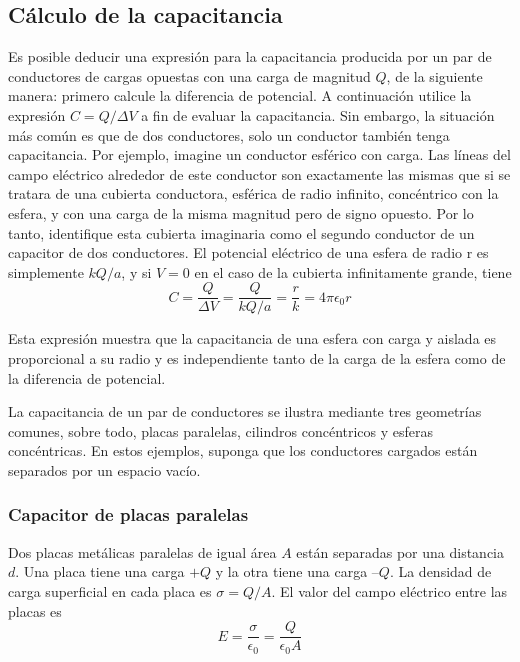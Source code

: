   \subsection{Cálculo de la capacitancia}
    \PN Es posible deducir una expresión para la capacitancia producida por un par de conductores de cargas opuestas con
    una carga de magnitud $Q$, de la siguiente manera: primero calcule la diferencia de potencial. A continuación
    utilice la expresión $C = Q / \Delta V$ a fin de evaluar la capacitancia.
    \PN Sin embargo, la situación más común es que de dos conductores, solo un conductor también tenga capacitancia. Por
    ejemplo, imagine un conductor esférico con carga. Las líneas del campo eléctrico alrededor de este conductor son
    exactamente las mismas que si se tratara de una cubierta conductora, esférica de radio infinito, concéntrico con la
    esfera, y con una carga de la misma magnitud pero de signo opuesto. Por lo tanto, identifique esta cubierta
    imaginaria como el segundo conductor de un capacitor de dos conductores. El potencial eléctrico de una esfera de
    radio r es simplemente $k Q/a$, y si $V = 0$ en el caso de la cubierta infinitamente grande, tiene
    \begin{equation*}
      C = \frac{Q}{\Delta V} = \frac{Q}{k Q/a} = \frac{r}{k} = 4 \pi \epsilon_{0} r
    \end{equation*}

    \PN Esta expresión muestra que la capacitancia de una esfera con carga y aislada es proporcional a su radio y es
    independiente tanto de la carga de la esfera como de la diferencia de potencial.

    \PN La capacitancia de un par de conductores se ilustra mediante tres geometrías comunes, sobre todo, placas
    paralelas, cilindros concéntricos y esferas concéntricas. En estos ejemplos, suponga que los conductores cargados
    están separados por un espacio vacío.

    \subsubsection{Capacitor de placas paralelas}
      \PN Dos placas metálicas paralelas de igual área $A$ están separadas por una distancia $d$. Una placa tiene una
      carga $+Q$ y la otra tiene una carga $–Q$. La densidad de carga superficial en cada placa es $ \sigma = Q/A$. El
      valor del campo eléctrico entre las placas es
      \begin{equation*}
        E = \frac{\sigma}{\epsilon_{0}} = \frac{Q}{\epsilon_{0}A}
      \end{equation*}

